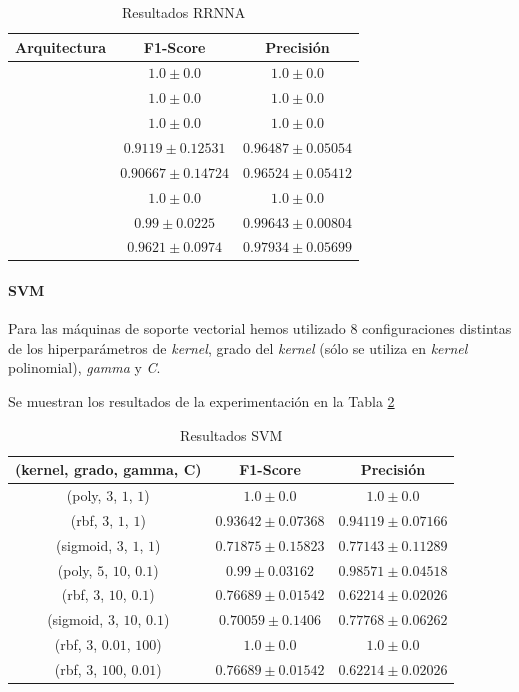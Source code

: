 \documentclass[12pt]{article}
\begin{document}
\begin{table}[ht]
	\caption{Resultados RRNNA}
	\centering
		 \begin{tabular}{||c c c||}
			 \hline
			 Arquitectura & F1-Score & Precisión  \\ [0.5ex]
			 \hline\hline
			 [2] & $1.0 \pm 0.0$ & $1.0 \pm 0.0$ \\
			 \hline
			 [4] & $1.0 \pm 0.0$ & $1.0 \pm 0.0$ \\
			 \hline
			 [8] & $1.0 \pm 0.0$ & $1.0 \pm 0.0$ \\
			 \hline
			 [2, 4] & $0.9119 \pm 0.12531$ & $0.96487 \pm 0.05054$ \\
			 \hline
			 [2, 8] & $0.90667 \pm 0.14724$ & $0.96524 \pm 0.05412$ \\
			 \hline
			 [4, 2] & $1.0 \pm 0.0$ & $1.0 \pm 0.0$ \\
			 \hline
			 [4, 4] & $0.99 \pm 0.0225$ & $0.99643 \pm 0.00804$ \\
			 \hline
			 [4, 8] & $0.9621 \pm 0.0974$ & $0.97934 \pm 0.05699$ \\
			 \hline
		 \end{tabular}
	\label{Tab:ANN}
\end{table}

\paragraph{SVM}

Para las máquinas de soporte vectorial hemos utilizado 8 configuraciones distintas de los hiperparámetros de \textit{kernel},
grado del \textit{kernel} (sólo se utiliza en \textit{kernel} polinomial), \textit{gamma} y \textit{C}.

Se muestran los resultados de la experimentación en la Tabla \ref{Tab:SVM}

\begin{table}[h!]
\caption{Resultados SVM}
\centering
	 \begin{tabular}{||c c c||}
		 \hline
		 (kernel, grado, gamma, C) & F1-Score & Precisión  \\ [0.5ex]
		 \hline\hline
		 (poly, $3$, $1$, $1$) & $1.0 \pm 0.0$ & $1.0 \pm 0.0$ \\
		 \hline
		 (rbf, $3$, $1$, $1$) & $0.93642 \pm 0.07368$ & $0.94119 \pm 0.07166$ \\
		 \hline
		 (sigmoid, $3$, $1$, $1$) & $0.71875 \pm 0.15823$ & $0.77143 \pm 0.11289$ \\
		 \hline
		 (poly, $5$, $10$, $0.1$) & $0.99 \pm 0.03162$ & $0.98571 \pm 0.04518$ \\
		 \hline
		 (rbf, $3$, $10$, $0.1$) & $0.76689 \pm 0.01542$ & $0.62214 \pm 0.02026$ \\
		 \hline
		 (sigmoid, $3$, $10$, $0.1$) & $0.70059 \pm 0.1406$ & $0.77768 \pm 0.06262$ \\
		 \hline
		 (rbf, $3$, $0.01$, $100$) & $1.0 \pm 0.0$ & $1.0 \pm 0.0$ \\
		 \hline
		 (rbf, $3$, $100$, $0.01$) & $0.76689 \pm 0.01542$ & $0.62214 \pm 0.02026$ \\
		 \hline
	 \end{tabular}
\label{Tab:SVM}
\end{table}
\end{document}
